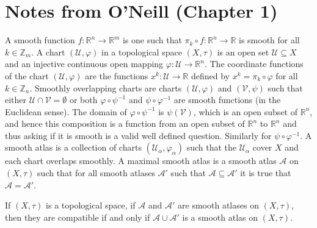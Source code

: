 \documentclass{article}                                                        %
\begin{document}
    \section{Notes from O'Neill (Chapter 1)}
        A smooth function $f:\mathbb{R}^{n}\rightarrow\mathbb{R}^{m}$ is one
        such that $\pi_{k}\circ{f}:\mathbb{R}^{n}\rightarrow\mathbb{R}$ is
        smooth for all $k\in\mathbb{Z}_{m}$. A chart $(\mathcal{U},\varphi)$ in
        a topological space $(X,\tau)$ is an open set $\mathcal{U}\subseteq{X}$
        and an injective continuous open mapping
        $\varphi:\mathcal{U}\rightarrow\mathbb{R}^{n}$. The coordinate functions
        of the chart $(\mathcal{U},\varphi)$ are the functions
        $x^{k}:\mathcal{U}\rightarrow\mathbb{R}$ defined by
        $x^{k}=\pi_{k}\circ\varphi$ for all $k\in\mathbb{Z}_{n}$. Smoothly
        overlapping charts are charts $(\mathcal{U},\varphi)$ and
        $(\mathcal{V},\psi)$ such that either
        $\mathcal{U}\cap\mathcal{V}=\emptyset$ or both
        $\varphi\circ\psi^{\minus{1}}$ and $\psi\circ\varphi^{\minus{1}}$ are
        smooth functions (in the Euclidean sense). The domain of
        $\varphi\circ\psi^{\minus{1}}$ is $\psi(\mathcal{V})$, which is an open
        subset of $\mathbb{R}^{n}$, and hence this composition is a function
        from an open subset of $\mathbb{R}^{n}$ to $\mathbb{R}^{n}$ and thus
        asking if it is smooth is a valid well defined question. Similarly for
        $\psi\circ\varphi^{\minus{1}}$. A smooth atlas is a collection of charts
        $(\mathcal{U}_{\alpha},\varphi_{\alpha})$ such that the
        $\mathcal{U}_{\alpha}$ cover $X$ and each chart overlaps smoothly. A
        maximal smooth atlas is a smooth atlas $\mathcal{A}$ on $(X,\tau)$ such
        that for all smooth atlases $\mathcal{A}'$ such that
        $\mathcal{A}\subseteq\mathcal{A}'$ it is true that
        $\mathcal{A}=\mathcal{A}'$.
        \begin{theorem}
            If $(X,\tau)$ is a topological space, if $\mathcal{A}$ and
            $\mathcal{A}'$ are smooth atlases on $(X,\tau)$, then they are
            compatible if and only if $\mathcal{A}\cup\mathcal{A}'$ is a smooth
            atlas on $(X,\tau)$.
        \end{theorem}
\end{document}
